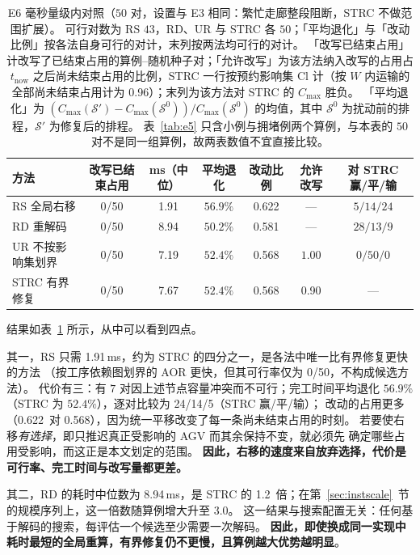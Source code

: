 \documentclass[manuscript,screen,review]{acmart}
\providecommand{\STRC}{\textsc{STRC}}
\newcommand{\NPairs}{50}
\newcommand{\FeasRone}{0/\NPairs}            %
\newcommand{\ClosureAliveFrac}{90\%}
\newcommand{\MsShift}{1.91}          %
\newcommand{\MsRedecode}{8.94}       %
\newcommand{\MsAllFuture}{7.19}      %
\newcommand{\MsCheapRtwo}{7.67}      %
\newcommand{\RedecodeRatio}{1.2}     %
\newcommand{\ShiftBad}{0/\NPairs}    %
\newcommand{\RedecodeBad}{0/\NPairs}
\newcommand{\WinVsShift}{24/14/5}  %
\newcommand{\ResFracCheapRtwo}{0.568}
\newcommand{\ResFracShift}{0.622}
\newcommand{\ResFracRedecode}{0.581}
\newcommand{\ResFracAllFuture}{0.568}
\newcommand{\ClosureShareMean}{0.90} %
\newcommand{\ScaleRatioHi}{3.0}  %
\newcommand{\SegShare}{0.96}             %
\begin{document}
\begin{table}[t]
\centering
\caption{E6 毫秒量级内对照（\(\NPairs\) 对，设置与 E3 相同：繁忙走廊整段阻断，\STRC{} 不做范围扩展）。
可行对数为 RS \(43\)，RD、UR 与 \STRC{} 各 \(\NPairs\)；「平均退化」与「改动比例」按各法自身可行的对计，末列按两法均可行的对计。
「改写已结束占用」计改写了已结束占用的算例--随机种子对；「允许改写」为该方法纳入改写的占用占 \(t_{\mathrm{now}}\)
之后尚未结束占用的比例，\STRC{} 一行按预约影响集 \(\mathrm{Cl}\) 计（按 \(W\) 内运输的全部尚未结束占用计为 \SegShare）；末列为该方法对 \STRC{} 的 \(C_{\max}\) 胜负。
「平均退化」为 \((C_{\max}(\mathcal{S}')-C_{\max}(\mathcal{S}^0))/C_{\max}(\mathcal{S}^0)\) 的均值，其中 \(\mathcal{S}^0\) 为扰动前的排程，\(\mathcal{S}'\) 为修复后的排程。
表~\ref{tab:e5} 只含小例与拥堵例两个算例，与本表的 \(\NPairs\) 对不是同一组算例，故两表数值不宜直接比较。}
\label{tab:cheap}
\small
\begin{tabular}{@{}lcccccc@{}}
\toprule
方法 & 改写已结束占用 & ms（中位）& 平均退化 & 改动比例 & 允许改写 & 对 \STRC{} 赢/平/输 \\
\midrule
RS 全局右移      & \ShiftBad     & \MsShift    & \(56.9\%\) & \ResFracShift    & ---   & \(5/14/24\) \\
RD 重解码        & \RedecodeBad  & \MsRedecode & \(50.2\%\) & \ResFracRedecode & ---   & \(28/13/9\) \\
UR 不按影响集划界 & \ShiftBad     & \MsAllFuture & \(52.4\%\) & \ResFracAllFuture & \(1.00\) & \(0/50/0\) \\
\STRC{} 有界修复      & \ShiftBad     & \MsCheapRtwo & \(52.4\%\) & \ResFracCheapRtwo & \ClosureShareMean & --- \\
\bottomrule
\end{tabular}
\end{table}

结果如表~\ref{tab:cheap} 所示，从中可以看到四点。

其一，RS 只需 \MsShift\,ms，约为 \STRC{} 的四分之一，是各法中唯一比有界修复更快的方法
（按工序依赖图划界的 AOR 更快，但其可行率仅为 \FeasRone，不构成候选方法）。
代价有三：有 \(7\) 对因上述节点容量冲突而不可行；完工时间平均退化 \(56.9\%\)（\STRC{} 为 \(52.4\%\)），逐对比较为 \WinVsShift（\STRC{} 赢/平/输）；
改动的占用更多（\ResFracShift\ 对 \ResFracCheapRtwo），因为统一平移改变了每一条尚未结束占用的时刻。
若要使右移\emph{有选择}，即只推迟真正受影响的 AGV 而其余保持不变，就必须先
确定哪些占用受影响，而这正是本文划定的范围。
\textbf{因此，右移的速度来自放弃选择，代价是可行率、完工时间与改写量都更差。}

其二，RD 的耗时中位数为 \MsRedecode\,ms，是 \STRC{} 的 \RedecodeRatio\ 倍；在第~\ref{sec:instscale}~节的规模序列上，这一倍数随算例增大升至 \(\ScaleRatioHi\)。
这一结果与搜索配置无关：任何基于解码的搜索，每评估一个候选至少需要一次解码。
\textbf{因此，即使换成同一实现中耗时最短的全局重算，有界修复仍不更慢，且算例越大优势越明显}。
\end{document}
